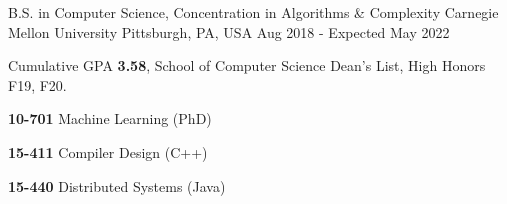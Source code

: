 

\begin{cventries}

  \eduentry
    {B.S. in Computer Science, Concentration in Algorithms \& Complexity} %
    {Carnegie Mellon University} %
    {Pittsburgh, PA, USA} %
    {Aug 2018 - Expected May 2022} %
    {
      \begin{cvitems} %
      \item {Cumulative GPA \textbf{3.58}, School of Computer Science Dean's List, High Honors F19, F20. }
      \item {}
        \setlength\multicolsep{0pt}
        \begin{multicols}{3}
          \item[] {\textbf{10-701} Machine Learning (PhD)}
          \item[] {\textbf{15-411} Compiler Design (C++)}
          \item[] {\textbf{15-440} Distributed Systems (Java)}

\end{multicols}
\end{cvitems}}
\end{cventries}
